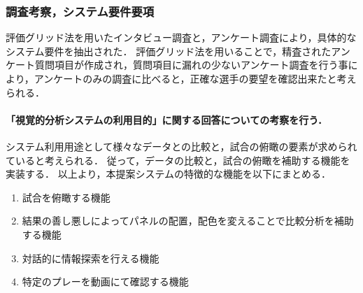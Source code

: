 \documentclass[sotsuron]{kuee}
\begin{document}
			\subsubsection{調査考察，システム要件要項}
				評価グリッド法を用いたインタビュー調査と，アンケート調査により，具体的なシステム要件を抽出された．
				評価グリッド法を用いることで，精査されたアンケート質問項目が作成され，質問項目に漏れの少ないアンケート調査を行う事により，アンケートのみの調査に比べると，正確な選手の要望を確認出来たと考えられる．
					\paragraph {「視覚的分析システムの利用目的」に関する回答についての考察を行う．}
						システム利用用途として様々なデータとの比較と，試合の俯瞰の要素が求められていると考えられる．
						従って，データの比較と，試合の俯瞰を補助する機能を実装する．
						以上より，本提案システムの特徴的な機能を以下にまとめる．
						\begin{enumerate}	
							\item 試合を俯瞰する機能
							\item 結果の善し悪しによってパネルの配置，配色を変えることで比較分析を補助する機能
							\item 対話的に情報探索を行える機能
							\item 特定のプレーを動画にて確認する機能
						\end{enumerate}
\end{document}
